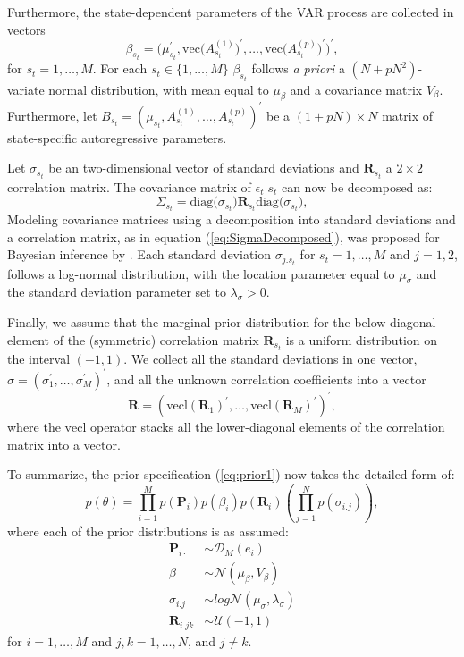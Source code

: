 \documentclass[final,3p,authoryear]{elsarticle}
\begin{document}
Furthermore, the state-dependent parameters of the VAR process are collected in vectors 
$$\beta_{s_t} = \biggl( \mu_{s_t}^{\prime}, \text{vec}\bigl(A_{s_t}^{(1)}\bigr)^{\prime},\dots,\text{vec}\bigl(A_{s_t}^{(p)}\bigr)^{\prime} \biggr)^{\prime},$$
for $s_t = 1,\dots,M$. For each $s_t\in\{1,\dots,M\}$ $\beta_{s_t}$ follows \emph{a priori} a $(N+pN^2)$-variate normal distribution, with mean equal to $\mu_\beta$ and a covariance matrix $V_\beta$. Furthermore, let $B_{s_t}=\left(\mu_{s_t}, A_{s_t}^{(1)},\dots,A_{s_t}^{(p)}\right)^{'}$ be a $(1+pN)\times N$ matrix of state-specific autoregressive parameters.



Let $\sigma_{s_t}$ be an two-dimensional vector of standard deviations and $\mathbf{R}_{s_t}$ a $2 \times 2$ correlation matrix. The covariance matrix of $\epsilon_t|s_t$ can now be decomposed as:
\begin{equation}\label{eq:SigmaDecomposed}
     \Sigma_{s_t} = \text{diag}\bigl(\sigma_{s_t}\bigr)\mathbf{R}_{s_t}\text{diag}\bigl(\sigma_{s_t}\bigr),
\end{equation}
Modeling covariance matrices using a decomposition into standard deviations and a correlation matrix, as in equation (\ref{eq:SigmaDecomposed}), was proposed for Bayesian inference by \cite{Barnard2000}. Each standard deviation $\sigma_{j.s_t}$ for $s_t = 1,\dots,M$ and $j=1,2$, follows a log-normal distribution, with the location parameter equal to $\mu_\sigma$ and the standard deviation parameter set to $\lambda_\sigma >0$.


Finally, we assume that the marginal prior distribution for the below-diagonal element of the (symmetric) correlation matrix $\mathbf{R}_{s_t}$ is a uniform distribution on the interval $(-1,1)$. We collect all the standard deviations in one vector, $\sigma = (\sigma_1^{\prime},\dots,\sigma_M^{\prime})^{\prime}$, and all the unknown correlation coefficients into a vector 
$$\mathbf{R} = (\text{vecl}(\mathbf{R}_1)^{\prime},\dots,\text{vecl}(\mathbf{R}_M)^{\prime})^{\prime},$$
where the $\text{vecl}$ operator stacks all the lower-diagonal elements of the correlation matrix into a vector. 


To summarize, the prior specification (\ref{eq:prior1}) now takes the detailed form of:
\begin{equation}\label{eq:prior2}
     p(\theta) = \prod_{i=1}^{M} p(\mathbf{P}_i)p(\beta_i)p(\mathbf{R}_i)\left( \prod_{j=1}^{N} p(\sigma_{i.j}) \right),
\end{equation} 
where each of the prior distributions is as assumed:
\begin{align*}
    \mathbf{P}_{i\cdot} &\sim \mathcal{D}_{M}(e_i) \\
    \beta &\sim \mathcal{N}(\mu_\beta,V_\beta) \\
    \sigma_{i.j} &\sim log\mathcal{N}(\mu_\sigma,\lambda_\sigma) \\
    \mathbf{R}_{i.jk} &\sim \mathcal{U}(-1,1)
\end{align*}
for $i=1,\dots,M$ and $j,k=1,\dots,N$, and $j\neq k$.
\end{document}
